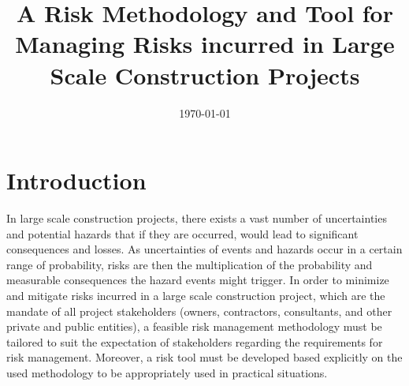 \documentclass[10pt,halfline,a4paper]{ouparticle}
\begin{document}
\title{A Risk Methodology and Tool for Managing Risks incurred in Large Scale Construction Projects}

\author{%
\address{\href{https://namkyodai.github.io/}{https://namkyodai.github.io/}}
}


\date{\today}


\maketitle


\section{Introduction}
\label{sec1}
In large scale construction projects, there exists a vast number of uncertainties and potential hazards that if they are occurred, would lead to significant consequences and losses. As uncertainties of events and hazards occur in a certain range of probability,  risks are then the multiplication of the probability and measurable consequences the hazard events might trigger. In order to minimize and mitigate risks incurred in a large scale construction project, which are the mandate of all project stakeholders (owners, contractors, consultants, and other private and public entities), a feasible risk management methodology must be tailored to suit the expectation of stakeholders regarding the requirements for risk management. Moreover, a risk tool must be developed based explicitly on the used methodology to be appropriately used in practical situations. 
\end{document}
